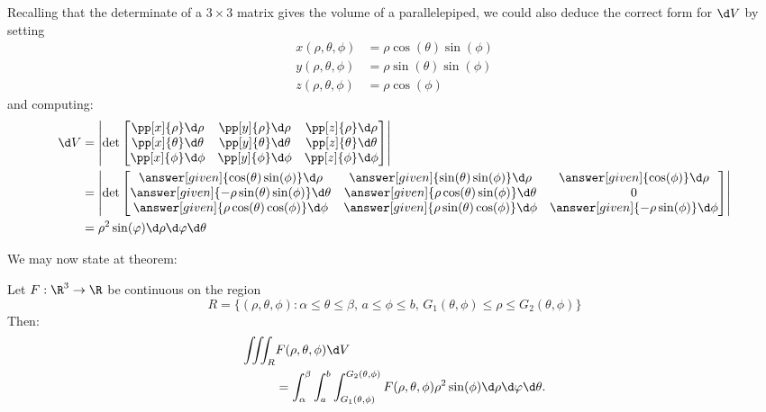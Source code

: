 \documentclass{ximera}
\begin{document}
\begin{remark}
Recalling that the determinate of a $3\times 3$ matrix gives
the volume of a parallelepiped, we could also deduce the correct form
for $\d V$ by setting
\begin{align*}
  x(\rho,\theta,\phi) &= \rho \cos(\theta)\sin(\phi)\\
  y(\rho,\theta,\phi) &= \rho \sin(\theta)\sin(\phi)\\
  z(\rho,\theta,\phi) &= \rho \cos(\phi)
\end{align*}
and computing:
\begin{align*}
  \d V &= \left| \det
  \begin{bmatrix}
    \pp[x]{\rho} \d \rho & \pp[y]{\rho} \d \rho & \pp[z]{\rho} \d \rho\\
    \pp[x]{\theta} \d \theta & \pp[y]{\theta} \d \theta & \pp[z]{\theta} \d \theta\\
    \pp[x]{\phi} \d \phi & \pp[y]{\phi} \d \phi & \pp[z]{\phi} \d \phi
  \end{bmatrix}
  \right|\\
  &= \left| \det
  \begin{bmatrix}
    \answer[given]{\cos(\theta)\sin(\phi)} \d \rho & \answer[given]{\sin(\theta)\sin(\phi)} \d \rho & \answer[given]{\cos(\phi)} \d \rho \\
    \answer[given]{-\rho\sin(\theta)\sin(\phi)} \d \theta & \answer[given]{\rho\cos(\theta)\sin(\phi)} \d \theta & 0\\
    \answer[given]{\rho\cos(\theta)\cos(\phi)} \d \phi & \answer[given]{\rho\sin(\theta)\cos(\phi)} \d \phi & \answer[given]{-\rho\sin(\phi)}\d \phi
  \end{bmatrix}
  \right|\\
  &= \rho^2 \sin(\varphi)\d\rho\d\varphi\d\theta
\end{align*}
\end{remark}



We may now state at theorem:
\begin{theorem}[Fubini]
  Let $F:\R^3\to\R$ be continuous on the region
  \[
  R=\{(\rho,\theta,\phi):\text{$\alpha\leq\theta\leq\beta$, $a\leq \phi\leq b$, $G_1(\theta,\phi)\le \rho\le G_2(\theta,\phi)$}\}
  \]
  Then: 
  \begin{align*}
  \iiint_R &F(\rho,\theta,\phi)\d V\\
  &= \int_\alpha^\beta\int_{a}^{b} \int_{G_1(\theta,\phi)}^{G_2(\theta,\phi)}F(\rho,\theta,\phi) \rho^2 \sin(\phi)\d\rho\d\varphi\d\theta.
  \end{align*}
\end{theorem}
\end{document}
